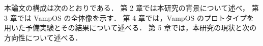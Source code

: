本論文の構成は次のとおりである．
第 2 章では本研究の背景について述べ，
第 3 章では VampOS の全体像を示す．
第 4 章では，VampOS のプロトタイプを用いた予備実験とその結果について述べる．
第 5 章では，本研究の現状と次の方向性について述べる．



